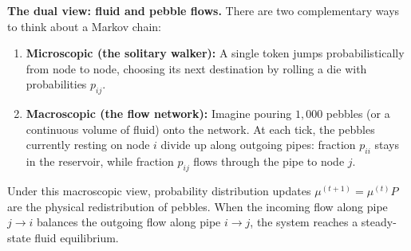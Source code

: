 \begin{intuitionbox}
\textbf{The dual view: fluid and pebble flows.}
There are two complementary ways to think about a Markov chain:
\begin{enumerate}
  \item \textbf{Microscopic (the solitary walker):} A single token jumps probabilistically from node to node, choosing its next destination by rolling a die with probabilities $p_{ij}$.
  \item \textbf{Macroscopic (the flow network):} Imagine pouring $1{,}000$ pebbles (or a continuous volume of fluid) onto the network. At each tick, the pebbles currently resting on node $i$ divide up along outgoing pipes: fraction $p_{ii}$ stays in the reservoir, while fraction $p_{ij}$ flows through the pipe to node $j$.
\end{enumerate}
Under this macroscopic view, probability distribution updates $\mu^{(t+1)} = \mu^{(t)}P$ are the physical redistribution of pebbles. When the incoming flow along pipe $j \to i$ balances the outgoing flow along pipe $i \to j$, the system reaches a steady-state fluid equilibrium.
\end{intuitionbox}

